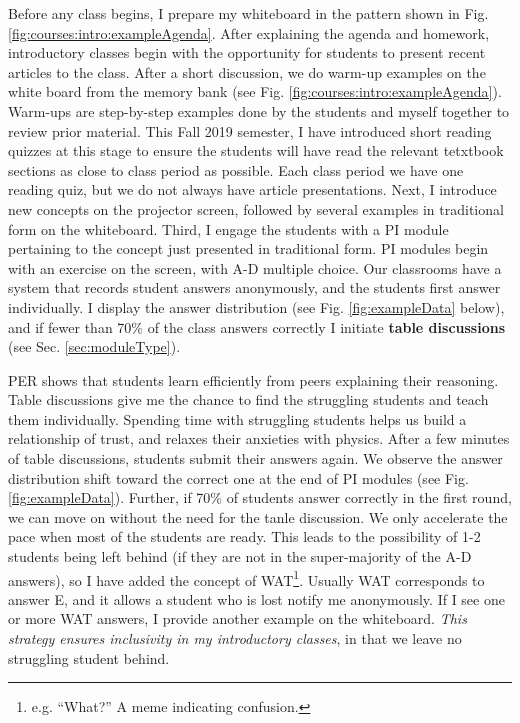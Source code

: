 \documentclass[../../../main.tex]{subfiles}
\begin{document}
Before any class begins, I prepare my whiteboard in the pattern shown in Fig. \ref{fig:courses:intro:exampleAgenda}.  After explaining the agenda and homework, introductory classes begin with the opportunity for students to present recent articles to the class.  After a short discussion, we do warm-up examples on the white board from the memory bank (see Fig. \ref{fig:courses:intro:exampleAgenda}).  Warm-ups are step-by-step examples done by the students and myself together to review prior material.  This Fall 2019 semester, I have introduced short reading quizzes at this stage to ensure the students will have read the relevant tetxtbook sections as close to class period as possible.  Each class period we have one reading quiz, but we do not always have article presentations.  Next, I introduce new concepts on the projector screen, followed by several examples in traditional form on the whiteboard.  Third, I engage the students with a PI module pertaining to the concept just presented in traditional form.  PI modules begin with an exercise on the screen, with A-D multiple choice.  Our classrooms have a system that records student answers anonymously, and the students first answer individually.  I display the answer distribution (see Fig. \ref{fig:exampleData} below), and if fewer than 70\% of the class answers correctly I initiate \textbf{table discussions} (see Sec. \ref{sec:moduleType}).  \\ \hspace{0.1cm}

PER shows that students learn efficiently from peers explaining their reasoning.  Table discussions give me the chance to find the struggling students and teach them individually. Spending time with struggling students helps us build a relationship of trust, and relaxes their anxieties with physics.  After a few minutes of table discussions, students submit their answers again.  We observe the answer distribution shift toward the correct one at the end of PI modules (see Fig. \ref{fig:exampleData}).  Further, if 70\% of students answer correctly in the first round, we can move on without the need for the tanle discussion.  We only accelerate the pace when most of the students are ready.  This leads to the possibility of 1-2 students being left behind (if they are not in the super-majority of the A-D answers), so I have added the concept of WAT\footnote{e.g. ``What?'' A meme indicating confusion.}.  Usually WAT corresponds to answer E, and it allows a student who is lost notify me anonymously.  If I see one or more WAT answers, I provide another example on the whiteboard.  \textit{This strategy ensures inclusivity in my introductory classes}, in that we leave no struggling student behind.  \\ \hspace{0.1cm}
\end{document}
